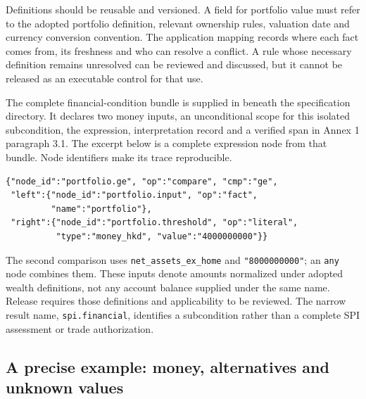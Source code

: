 Definitions should be reusable and versioned. A field for portfolio value must
refer to the adopted portfolio definition, relevant ownership rules, valuation
date and currency conversion convention. The application mapping records where
each fact comes from, its freshness and who can resolve a conflict. A rule whose
necessary definition remains unresolved can be reviewed and discussed, but it
cannot be released as an executable control for that use.

The complete financial-condition bundle is supplied in
 beneath the specification directory.
It declares two money inputs, an unconditional scope for this isolated
subcondition, the expression, interpretation record and a verified span in
Annex 1 paragraph 3.1. The excerpt below is a complete expression node from
that bundle. Node identifiers make its trace reproducible.

\begin{minipage}{\textwidth}
\begin{lstlisting}[caption={The portfolio comparison in the supplied JSON bundle. Amounts are HK cents.}]
{"node_id":"portfolio.ge", "op":"compare", "cmp":"ge",
 "left":{"node_id":"portfolio.input", "op":"fact",
         "name":"portfolio"},
 "right":{"node_id":"portfolio.threshold", "op":"literal",
          "type":"money_hkd", "value":"4000000000"}}
\end{lstlisting}
\end{minipage}

The second comparison uses \texttt{net\_assets\_ex\_home} and
\texttt{"8000000000"}; an \texttt{any} node combines them. These inputs denote
amounts normalized under adopted wealth definitions, not any account balance
supplied under the same name. Release requires those definitions and applicability
to be reviewed. The narrow result name, \texttt{spi.financial}, identifies a
subcondition rather than a complete SPI assessment or trade authorization.



\subsection{A precise example: money, alternatives and unknown values}
\label{sec:semantics}


